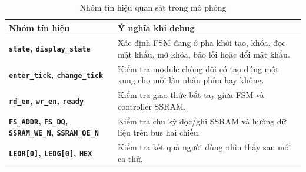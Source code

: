 \documentclass[13pt,a4paper]{article}
\begin{document}
\begin{table}[H]
\centering
\caption{Nhóm tín hiệu quan sát trong mô phỏng}
\label{tab:wave_signals}
\begin{tabularx}{\textwidth}{|>{\bfseries}p{4cm}|X|}
\hline
\textbf{Nhóm tín hiệu} & \textbf{Ý nghĩa khi debug}\\
\hline
\texttt{state}, \texttt{display\_state} & Xác định FSM đang ở pha khởi tạo, khóa, đọc mật khẩu, mở khóa, báo lỗi hoặc đổi mật khẩu.\\
\hline
\texttt{enter\_tick}, \texttt{change\_tick} & Kiểm tra module chống dội có tạo đúng một xung cho mỗi lần nhấn phím hay không.\\
\hline
\texttt{rd\_en}, \texttt{wr\_en}, \texttt{ready} & Kiểm tra giao thức bắt tay giữa FSM và controller SSRAM.\\
\hline
\texttt{FS\_ADDR}, \texttt{FS\_DQ}, \texttt{SSRAM\_WE\_N}, \texttt{SSRAM\_OE\_N} & Kiểm tra chu kỳ đọc/ghi SSRAM và hướng dữ liệu trên bus hai chiều.\\
\hline
\texttt{LEDR[0]}, \texttt{LEDG[0]}, \texttt{HEX} & Kiểm tra kết quả người dùng nhìn thấy sau mỗi ca thử.\\
\hline
\end{tabularx}
\end{table}
\end{document}
